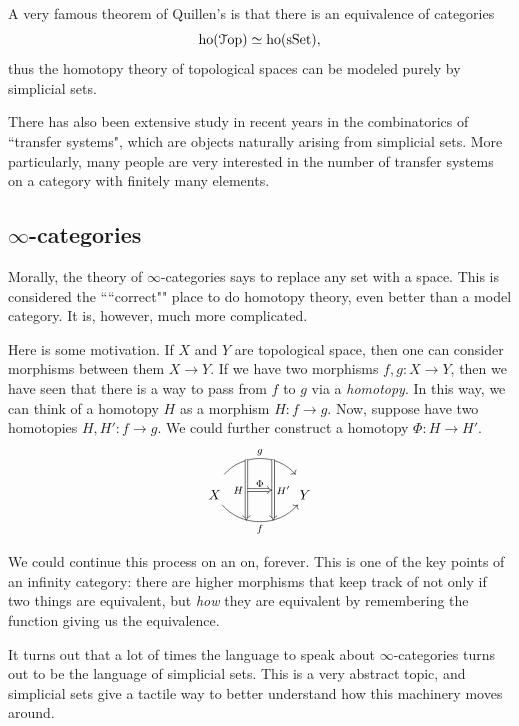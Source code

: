 \documentclass[10pt]{amsart}
\newcommand{\euscr}[1]{\EuScript{#1}}
\theoremstyle{definition}
\begin{document}
A very famous theorem of Quillen's is that there is an equivalence of categories
\[
\text{ho}(\euscr{T}\mathrm{op}) \simeq \mathrm{ho}(\mathrm{sSet}),
\]
thus the homotopy theory of topological spaces can be modeled purely by simplicial sets.

There has also been extensive study in recent years in the combinatorics of ``transfer systems", which are objects naturally arising from simplicial sets. More particularly, many people are very interested in the number of transfer systems on a category with finitely many elements.

\subsection*{$\infty$-categories}
Morally, the theory of $\infty$-categories says to replace any set with a space.
This is considered the ````correct"" place to do homotopy theory, even better than a model category. 
It is, however, much more complicated.

Here is some motivation. If $X$ and $Y$ are topological space, then one can consider morphisms between them $X \to Y$. If we have two morphisms $f, g:X \to Y$, then we have seen that there is a way to pass from $f$ to $g$ via a \emph{homotopy}. In this way, we can think of a homotopy $H$ as a morphism $H:f \to g$. Now, suppose have two homotopies $H, H':f \to g$. We could further construct a homotopy $\Phi:H \to H'$. 
\[
\begin{tikzcd}
	X && Y
	\arrow[""{name=0, anchor=center, inner sep=0}, "f"', bend right = 50, from=1-1, to=1-3]
	\arrow[""{name=1, anchor=center, inner sep=0}, "g", shift left=3, bend left = 50, from=1-1, to=1-3]
	\arrow[""{name=2, anchor=center, inner sep=0}, "H"', shift right=4,  Rightarrow, from=1, to=0]
	\arrow[""{name=3, anchor=center, inner sep=0}, "{H'}", shift left=4,  Rightarrow, from=1, to=0]
	\arrow["\Phi",  Rightarrow,  from=2, to=3]
\end{tikzcd}
\]

We could continue this process on an on, forever. This is one of the key points of an infinity category: there are higher morphisms that keep track of not only if two things are equivalent, but \emph{how} they are equivalent by remembering the function giving us the equivalence.

It turns out that a lot of times the language to speak about $\infty$-categories turns out to be the language of simplicial sets. This is a very abstract topic, and simplicial sets give a tactile way to better understand how this machinery moves around.
\end{document}
